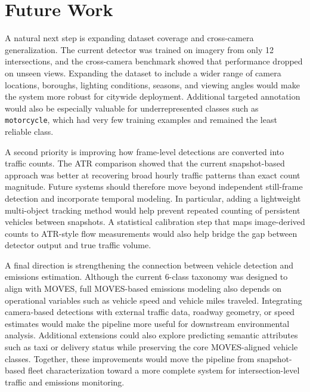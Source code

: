 \newpage
\section{Future Work}

A natural next step is expanding dataset coverage and cross-camera generalization. 
The current detector was trained on imagery from only 12 intersections, and the 
cross-camera benchmark showed that performance dropped on unseen views. Expanding 
the dataset to include a wider range of camera locations, boroughs, lighting 
conditions, seasons, and viewing angles would make the system more robust for 
citywide deployment. Additional targeted annotation would also be especially 
valuable for underrepresented classes such as \verb|motorcycle|, which had very 
few training examples and remained the least reliable class.

A second priority is improving how frame-level detections are converted into traffic 
counts. The ATR comparison showed that the current snapshot-based approach was better
at recovering broad hourly traffic patterns than exact count magnitude. Future 
systems should therefore move beyond independent still-frame detection and incorporate 
temporal modeling. In particular, adding a lightweight multi-object tracking method 
would help prevent repeated counting of persistent vehicles between snapshots. A statistical calibration
step that maps image-derived counts to ATR-style flow measurements would also help 
bridge the gap between detector output and true traffic volume.

A final direction is strengthening the connection between vehicle detection and 
emissions estimation. Although the current 6-class taxonomy was designed to align 
with MOVES, full MOVES-based emissions modeling also depends on operational variables
such as vehicle speed and vehicle miles traveled. Integrating camera-based detections
with external traffic data, roadway geometry, or speed estimates would make the 
pipeline more useful for downstream environmental analysis. Additional extensions 
could also explore predicting semantic attributes such as taxi or delivery status 
while preserving the core MOVES-aligned vehicle classes. Together, these improvements
would move the pipeline from snapshot-based fleet characterization toward a more 
complete system for intersection-level traffic and emissions monitoring.

